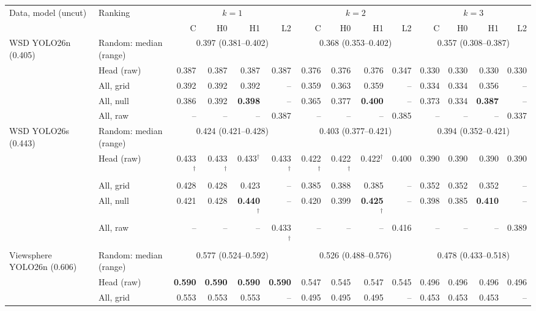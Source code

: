 \begin{tabular}{llrrrrrrrrrrrr}
\toprule
Data, model (uncut) & Ranking & \multicolumn{4}{c}{$k=1$} & \multicolumn{4}{c}{$k=2$} & \multicolumn{4}{c}{$k=3$} \\
\cmidrule(lr){3-6}\cmidrule(lr){7-10}\cmidrule(lr){11-14}
 & & C & H0 & H1 & L2 & C & H0 & H1 & L2 & C & H0 & H1 & L2 \\
\midrule
WSD YOLO26n (0.405) & Random: median (range) & \multicolumn{4}{c}{0.397 (0.381--0.402)} & \multicolumn{4}{c}{0.368 (0.353--0.402)} & \multicolumn{4}{c}{0.357 (0.308--0.387)} \\
 & Head (raw) & 0.387 & 0.387 & 0.387 & 0.387 & 0.376 & 0.376 & 0.376 & 0.347 & 0.330 & 0.330 & 0.330 & 0.330 \\
 & All, grid & 0.392 & 0.392 & 0.392 & -- & 0.359 & 0.363 & 0.359 & -- & 0.334 & 0.334 & 0.356 & -- \\
 & All, null & 0.386 & 0.392 & \textbf{0.398} & -- & 0.365 & 0.377 & \textbf{0.400} & -- & 0.373 & 0.334 & \textbf{0.387} & -- \\
 & All, raw & -- & -- & -- & 0.387 & -- & -- & -- & 0.385 & -- & -- & -- & 0.337 \\
\midrule
WSD YOLO26s (0.443) & Random: median (range) & \multicolumn{4}{c}{0.424 (0.421--0.428)} & \multicolumn{4}{c}{0.403 (0.377--0.421)} & \multicolumn{4}{c}{0.394 (0.352--0.421)} \\
 & Head (raw) & 0.433$^\dagger$ & 0.433$^\dagger$ & 0.433$^\dagger$ & 0.433$^\dagger$ & 0.422$^\dagger$ & 0.422$^\dagger$ & 0.422$^\dagger$ & 0.400 & 0.390 & 0.390 & 0.390 & 0.390 \\
 & All, grid & 0.428 & 0.428 & 0.423 & -- & 0.385 & 0.388 & 0.385 & -- & 0.352 & 0.352 & 0.352 & -- \\
 & All, null & 0.421 & 0.428 & \textbf{0.440$^\dagger$} & -- & 0.420 & 0.399 & \textbf{0.425$^\dagger$} & -- & 0.398 & 0.385 & \textbf{0.410} & -- \\
 & All, raw & -- & -- & -- & 0.433$^\dagger$ & -- & -- & -- & 0.416 & -- & -- & -- & 0.389 \\
\midrule
Viewsphere YOLO26n (0.606) & Random: median (range) & \multicolumn{4}{c}{0.577 (0.524--0.592)} & \multicolumn{4}{c}{0.526 (0.488--0.576)} & \multicolumn{4}{c}{0.478 (0.433--0.518)} \\
 & Head (raw) & \textbf{0.590} & \textbf{0.590} & \textbf{0.590} & \textbf{0.590} & 0.547 & 0.545 & 0.547 & 0.545 & 0.496 & 0.496 & 0.496 & 0.496 \\
 & All, grid & 0.553 & 0.553 & 0.553 & -- & 0.495 & 0.495 & 0.495 & -- & 0.453 & 0.453 & 0.453 & -- \\

\end{tabular}
